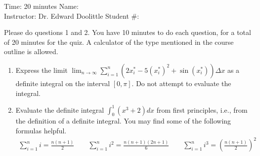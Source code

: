 \documentclass[12pt]{article}
\newcommand{\ds}{\displaystyle}
\begin{document}
\thispagestyle{plain}

\begin{flushleft}
Time:  20 minutes                \hfill       Name: \underline{\hspace{2in}} \\
Instructor: Dr. Edward Doolittle \hfill Student \#: \underline{\hspace{2in}}
\end{flushleft}

\noindent
Please do questions 1 and 2.  You have 10 minutes
to do each question, for a total of 20
minutes for the quiz.  A 
calculator of the type mentioned in the course outline is allowed.

\begin{enumerate}
\item Express 
  the limit
  $\ds\lim_{n\to\infty}\sum_{i=1}^n
    \left(2x_i^*-5(x_i^*)^2+\sin(x_i^*)\right) \Delta x$ 
  as a definite integral on the interval $[0,\pi]$.  
  Do not attempt to evaluate the integral.
\vfill
\newpage
\item Evaluate 
  the definite integral $\ds \int_0^1 (x^3+2) dx$ from first principles,
  i.e., from the definition of a definite integral.  You may find some of
  the following formulas helpful.
  \begin{align*}
    \sum_{i=1}^n i = \frac{n(n+1)}{2}
    \qquad
    \sum_{i=1}^n i^2 = \frac{n(n+1)(2n+1)}{6}
    \qquad
    \sum_{i=1}^n i^3 = \left(\frac{n(n+1)}{2}\right)^2
  \end{align*}
\vfill
\end{enumerate}
\end{document}
